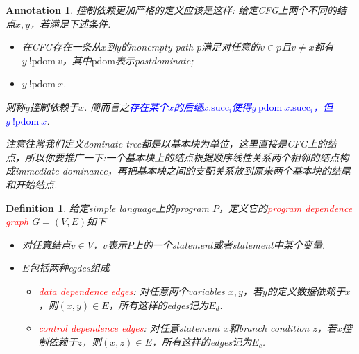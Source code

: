 \documentclass{article}
\newtheorem{definition}[theorem]{Definition}
\newtheorem{annotation}[theorem]{Annotation}
\newcommand{\redt}[1]{\textcolor{red}{#1}}
\newcommand{\bluet}[1]{\textcolor{blue}{#1}}
\begin{document}
\begin{annotation}\label{the-def-of-control-dependence}
\rm 控制依赖更加严格的定义应该是这样: 给定CFG上两个不同的结点$x,y$，若满足下述条件: 
\begin{itemize}
	\item 在CFG存在一条从$x$到$y$的nonempty path $p$满足对任意的$v \in p$且$v \neq x$都有$y~\text{!pdom}~v$，其中$\text{pdom}$表示postdominate;  
	\item $y~\text{!pdom}~x$. 
\end{itemize}
则称$y$控制依赖于$x$. 简而言之\bluet{存在某个$x$的后继$x.{\text{succ}_i}$使得$y~\text{pdom}~x.{\text{succ}_i}$，但$y~\text{!pdom}~x$}. 

注意往常我们定义dominate tree都是以基本块为单位，这里直接是CFG上的结点，所以你要推广一下:一个基本块上的结点根据顺序线性关系两个相邻的结点构成immediate dominance，再把基本块之间的支配关系放到原来两个基本块的结尾和开始结点.   
\end{annotation}



\begin{definition}
\rm 给定simple language上的program $P$，定义它的\redt{program dependence graph} $G = (V,E)$如下
\begin{itemize}
	\item 对任意结点$v \in V$，$v$表示$P$上的一个statement或者statement中某个变量. 
	\item $E$包括两种egdes组成
		\begin{itemize}
			\item \redt{data dependence edges}: 对任意两个variables $x,y$，若$y$的定义数据依赖于$x$，则$(x,y) \in E$，所有这样的edges记为$E_d$. 
			\item \redt{control dependence edges}: 对任意statement $x$和branch condition $z$，若$x$控制依赖于$z$，则$(x,z) \in E$，所有这样的edges记为$E_c$. 		
		\end{itemize}		 
\end{itemize}
\end{definition}
\end{document}
